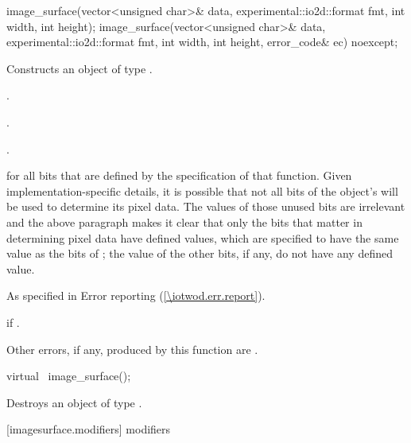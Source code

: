 \begin{itemdecl}
image_surface(vector<unsigned char>& data, experimental::io2d::format fmt,
  int width, int height);
image_surface(vector<unsigned char>& data, experimental::io2d::format fmt,
  int width, int height, error_code& ec) noexcept;
\end{itemdecl}
\begin{itemdescr}
\pnum
\effects
Constructs an object of type .

\pnum
\postconditions
{}.

\pnum
{}.

\pnum
{}.

\pnum
{} for all bits that are defined by the specification of that function.
\enternote
Given implementation-specific details, it is possible that not all bits of the  object's \underlyingimagesurface will be used to determine its pixel data. The values of those unused bits are irrelevant and the above paragraph makes it clear that only the bits that matter in determining pixel data have defined values, which are specified to have the same value as the bits of ; the value of the other bits, if any, do not have any defined value.
\exitnote

\pnum
\throws
As specified in Error reporting (\ref{\iotwod.err.report}).

\pnum
\errors
{} if .

\pnum
Other errors, if any, produced by this function are .
\end{itemdescr}

\begin{itemdecl}
virtual ~image_surface();
\end{itemdecl}
\begin{itemdescr}
\pnum
\effects
Destroys an object of type .
\end{itemdescr}

 [imagesurface.modifiers] { modifiers}

